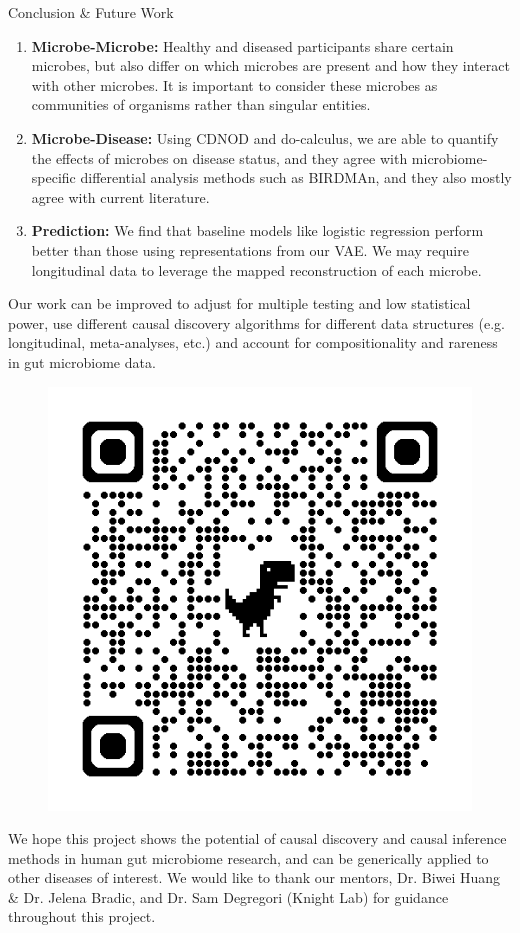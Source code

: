 \documentclass[final]{beamer}
\newlength{\colwidth}
\begin{document}
\begin{frame}[t]
\begin{columns}[t]
\begin{column}{\colwidth}
\begin{block}{Conclusion \& Future Work}
  \begin{enumerate}
      \item \textbf{Microbe-Microbe:} Healthy and diseased participants share certain microbes, but also differ on which microbes are present and how they interact with other microbes. It is important to consider these microbes as communities of organisms rather than singular entities.      
      \item \textbf{Microbe-Disease:} Using CDNOD and do-calculus, we are able to quantify the effects of microbes on disease status, and they agree with microbiome-specific differential analysis methods such as BIRDMAn, and they also mostly agree with current literature.
      \item \textbf{Prediction:} We find that baseline models like logistic regression perform better than those using representations from our VAE. We may require longitudinal data to leverage the mapped reconstruction of each microbe.
   \end{enumerate}
   
   Our work can be improved to adjust for multiple testing and low statistical power, use different causal discovery algorithms for different data structures (e.g. longitudinal, meta-analyses, etc.) and account for compositionality and rareness in gut microbiome data. 
	
	\begin{figure}
           \centering
           \includegraphics[width=\linewidth]{website_qr.png}
    	\end{figure} We hope this project shows the potential of causal discovery and causal inference methods in human gut microbiome research, and can be generically applied to other diseases of interest. We would like to thank our mentors, Dr. Biwei Huang \& Dr. Jelena Bradic,  and Dr. Sam Degregori (Knight Lab) for guidance throughout this project.
    

\end{block}
\end{column}
\end{columns}
\end{frame}
\end{document}
